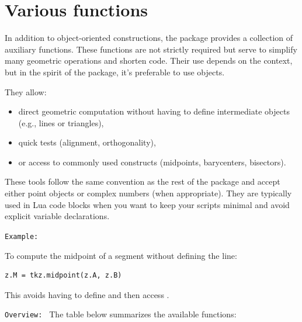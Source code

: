 \newpage
 \section{Various functions}

In addition to object-oriented constructions, the package provides a collection of auxiliary functions. These functions are not strictly required but serve to simplify many geometric operations and shorten code. Their use depends on the context, but in the spirit of the package, it's preferable to use objects.

\medskip
They allow:
\begin{itemize}
  \item direct geometric computation without having to define intermediate objects (e.g., lines or triangles),
  \item quick tests (alignment, orthogonality),
  \item or access to commonly used constructs (midpoints, barycenters, bisectors).
\end{itemize}

These tools follow the same convention as the rest of the package and accept either point objects or complex numbers (when appropriate). They are typically used in Lua code blocks when you want to keep your scripts minimal and avoid explicit variable declarations.

\medskip
\texttt{Example: }

To compute the midpoint of a segment without defining the line:
\begin{mybox}
\begin{verbatim}
z.M = tkz.midpoint(z.A, z.B)
\end{verbatim}
\end{mybox}
This avoids having to define  and then access .

\texttt{Overview: } The table below summarizes the available functions:


